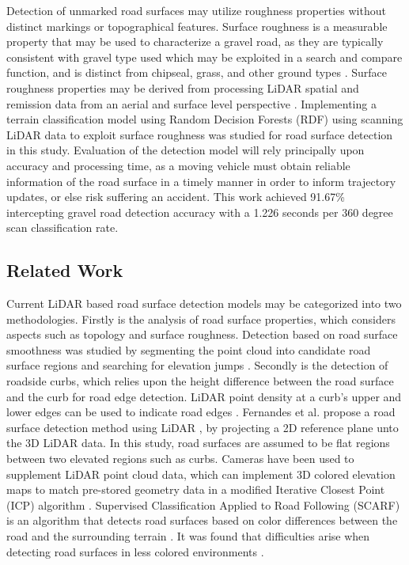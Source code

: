 \documentclass[journal,onecolumn]{IEEEtran}
\begin{document}
	{Detection of unmarked road surfaces may utilize roughness properties without distinct markings or topographical features. Surface roughness is a measurable property that may be used to characterize a gravel road, as they are typically consistent with gravel type used \cite{skorseth_gravel_nodate} which may be exploited in a search and compare function, and is distinct from chipseal, grass, and other ground types \cite{wan_road_2007, levi_3d_2012_light, levi_3d_2012_terrain}. Surface roughness properties may be derived from processing LiDAR spatial and remission data from an aerial and surface level perspective \cite{wan_road_2007, levi_3d_2012_light, levi_3d_2012_terrain, pollyea_experimental_2012,rychkov_computational_2012,lague_accurate_2013,brubaker_use_2013,turner_estimation_2014,campbell_lidar-based_2017,shepard_roughness_2001,tegowski_statistical_2016,sock_probabilistic_2016,milenkovic_roughness_2018,yadav_extraction_2017, yadav_rural_2018}. Implementing a terrain classification model using Random Decision Forests (RDF) using scanning LiDAR data to exploit surface roughness was studied for road surface detection in this study. Evaluation of the detection model will rely principally upon accuracy and processing time, as a moving vehicle must obtain reliable information of the road surface in a timely manner in order to inform trajectory updates, or else risk suffering an accident. This work achieved 91.67\% intercepting gravel road detection accuracy with a 1.226 seconds per 360 degree scan classification rate.}
		
\subsection{Related Work}
	
	{Current LiDAR based road surface detection models may be categorized into two methodologies. Firstly is the analysis of road surface properties, which considers aspects such as topology and surface roughness. Detection based on road surface smoothness was studied by segmenting the point cloud into candidate road surface regions and searching for elevation jumps \cite{liu_new_2013}. Secondly is the detection of roadside curbs, which relies upon the height difference between the road surface and the curb for road edge detection. LiDAR point density at a curb's upper and lower edges can be used to indicate road edges \cite{ibrahim_curb-based_2012}. Fernandes et al. propose a road surface detection method using LiDAR \cite{fernandes_road_2014}, by projecting a 2D reference plane unto the 3D LiDAR data. In this study, road surfaces are assumed to be flat regions between two elevated regions such as curbs. Cameras have been used to supplement LiDAR point cloud data, which can implement 3D colored elevation maps to match pre-stored geometry data in a modified Iterative Closest Point (ICP) algorithm \cite{manz_detection_2011}. Supervised Classification Applied to Road Following (SCARF) is an algorithm that detects road surfaces based on color differences between the road and the surrounding terrain \cite{crisman_scarf_1993}. It was found that difficulties arise when detecting road surfaces in less colored environments \cite{crisman_scarf_1993,manz_detection_2011}.}
	
\end{document}
